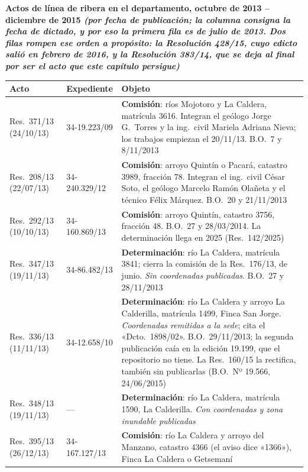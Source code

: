 {\sffamily\bfseries\footnotesize Actos de línea de ribera en el departamento, octubre de 2013 -- diciembre de 2015 \textit{(por fecha de publicación; la columna consigna la fecha de dictado, y por eso la primera fila es de julio de 2013. Dos filas rompen ese orden a propósito: la Resolución 428/15, cuyo edicto salió en febrero de 2016, y la Resolución 383/14, que se deja al final por ser el acto que este capítulo persigue)}\par}
\vspace{0.5em}
{\small
\setlength{\LTpre}{0.6em}\setlength{\LTpost}{1.2em}
\begin{longtable}{@{}p{2.2cm}p{2.9cm}p{6.8cm}@{}}
\toprule
\textbf{Acto} & \textbf{Expediente} & \textbf{Objeto} \\
\midrule
\endhead
Res.\ 371/13 (24/10/13) & 34-19.223/09 & \textbf{Comisión}: ríos Mojotoro y La Caldera, matrícula 3616. Integran el geólogo Jorge G.\ Torres y la ing.\ civil Mariela Adriana Nieva; los trabajos empiezan el 20/11/13. B.O.\ 7 y 8/11/2013 \\
Res.\ 208/13 (22/07/13) & 34-240.329/12 & \textbf{Comisión}: arroyo Quintín o Pacará, catastro 3989, fracción 78. Integran el ing.\ civil César Soto, el geólogo Marcelo Ramón Olañeta y el técnico Félix Márquez. B.O.\ 20 y 21/11/2013 \\
Res.\ 292/13 (10/10/13) & 34-160.869/13 & \textbf{Comisión}: arroyo Quintín, catastro 3756, fracción 48. B.O.\ 27 y 28/03/2014. La determinación llega en 2025 (Res.\ 142/2025) \\
Res.\ 347/13 (19/11/13) & 34-86.482/13 & \textbf{Determinación}: río La Caldera, matrícula 3841; cierra la comisión de la Res.\ 176/13, de junio. \textit{Sin coordenadas publicadas}. B.O.\ 27 y 28/11/2013 \\
Res.\ 336/13 (11/11/13) & 34-12.658/10 & \textbf{Determinación}: río La Caldera y arroyo La Calderilla, matrícula 1499, Finca San Jorge. \textit{Coordenadas remitidas a la sede}; cita el «Dcto.\ 1898/02». B.O.\ 29/11/2013; la segunda publicación caía en la edición 19.199, que el repositorio no tiene. La Res.\ 160/15 la rectifica, también sin publicarlas (B.O.\ Nº 19.566, 24/06/2015) \\
Res.\ 348/13 (19/11/13) & --- & \textbf{Determinación}: río La Caldera, matrícula 1590, La Calderilla. \textit{Con coordenadas y zona inundable publicadas} \\
Res.\ 395/13 (26/12/13) & 34-167.127/13 & \textbf{Comisión}: río La Caldera y arroyo del Manzano, catastro 4366 (el aviso dice «1366»), Finca La Caldera o Getsemaní \\

\end{longtable}}
